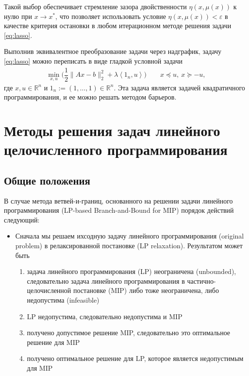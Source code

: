 \documentclass[%
	11pt,
	a4paper,
	utf8,
		]{article}
\begin{document}
Такой выбор обеспечивает стремление зазора двойственности $ \eta(x, \mu(x)) $ к нулю при $ x \rightarrow x^{*} $, что позволяет использовать условие $ \eta (x, \mu(x)) < \varepsilon $ в качестве критерия остановки в любом итерационном методе решения задачи \eqref{eq:lasso}.

Выполнив эквивалентное преобразование задачи через надграфик, задачу \eqref{eq:lasso} можно переписать в виде гладкой условной задачи
\begin{align*}
	\min_{x, u} \bigg( \dfrac{1}{2} \| Ax - b\|_2^2 + \lambda \left< 1_n, u \right> \bigg) \qquad x \preceq u, \ x \succeq - u,
\end{align*}
где $ x, u \in \mathbb{R}^n $ и $ 1_n := (1, \ldots, 1) \in \mathbb{R}^n $. Эта задача является задачей квадратичного программирования, и ее можно решать методом барьеров.


\section{Методы решения задач линейного целочисленного программирования}

\subsection{Общие положения}

В случае метода ветвей-и-границ, основанного на решении задачи линейного программирования (LP-based Branch-and-Bound for MIP) порядок действий следующий:
\begin{itemize}
	\item Сначала мы решаем ихсодную задачу линейного программирования (original problem) в релаксированной постановке (LP relaxation). Результатом может быть
	\begin{enumerate}
		\item задача линейного программирования (LP) неограничена (unbounded), следовательно задача линейного программирования в частично-целочисленной постановке (MIP) либо тоже неограничена, либо недопустима (infeasible)
		
		\item LP недопустима, следовательно недопустима и MIP
		
		\item получено допустимое решение MIP, следовательно это оптимальное решение для MIP
		
		\item получено оптимальное решение для LP, которое является недопустимым для MIP
	\end{enumerate}
\end{itemize}
\end{document}

